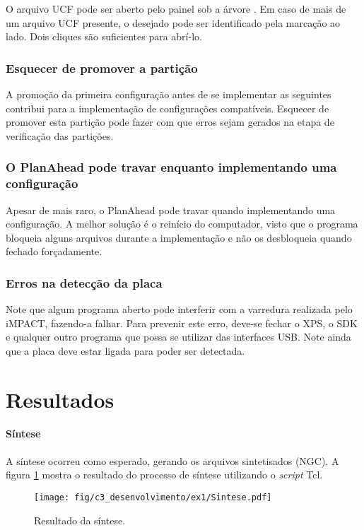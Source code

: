 \documentclass[11pt,a4paper,oneside]{book}
\begin{document}
O arquivo UCF pode ser aberto pelo painel  sob a árvore .
Em caso de mais de um arquivo UCF presente, o desejado pode ser identificado pela marcação  ao lado.
Dois cliques são suficientes para abrí-lo. 

\subsubsection{Esquecer de promover a partição}
A promoção da primeira configuração antes de se implementar as seguintes contribui para a implementação de configurações compatíveis.
Esquecer de promover esta partição pode fazer com que erros sejam gerados na etapa de verificação das partições.

\subsubsection{O PlanAhead pode travar enquanto implementando uma configuração}
Apesar de mais raro, o PlanAhead pode travar quando implementando uma configuração.
A melhor solução é o reinício do computador, visto que o programa bloqueia alguns arquivos durante a implementação e não os desbloqueia quando fechado forçadamente.


\subsubsection{Erros na detecção da placa}
Note que algum programa aberto pode interferir com a varredura realizada pelo iMPACT, fazendo-a falhar.
Para prevenir este erro, deve-se fechar o XPS, o SDK e qualquer outro programa que possa se utilizar das interfaces USB.
Note ainda que a placa deve estar ligada para poder ser detectada.

\section{Resultados}
\paragraph{Síntese}
A síntese ocorreu como esperado, gerando os arquivos sintetisados (NGC).
A figura \ref{fig:ex1:sintese} mostra o resultado do processo de síntese utilizando o \textit{script} Tcl.
\begin{figure}[h]
\centering
\texttt{[image: fig/c3\_desenvolvimento/ex1/Sintese.pdf]}
\caption{Resultado da síntese.}
\label{fig:ex1:sintese}
\end{figure}
\end{document}
